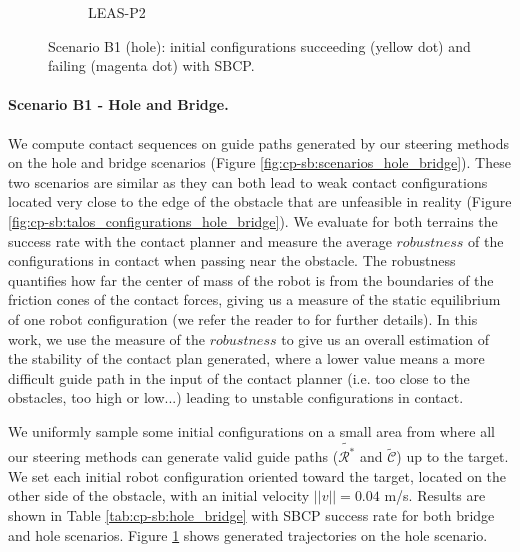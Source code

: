 \begin{figure}[t]
\begin{subfigure}[t]{0.48\linewidth}
        \caption{LEAS-P2}
    \end{subfigure}
    \caption{Scenario B1 (hole): initial configurations succeeding (yellow dot) and failing (magenta dot) with SBCP.}
    \label{fig:cp-sb:trajectories_hole}
\end{figure}

\paragraph{Scenario B1 - Hole and Bridge.} 
We compute contact sequences on guide paths generated by our steering methods on the hole and bridge scenarios (Figure \ref{fig:cp-sb:scenarios_hole_bridge}). 
These two scenarios are similar as they can both lead to weak contact configurations located very close to the edge of the obstacle that are unfeasible in reality (Figure \ref{fig:cp-sb:talos_configurations_hole_bridge}).
We evaluate for both terrains the success rate with the contact planner and measure the average $robustness$ of the configurations in contact when passing near the obstacle.
The robustness quantifies how far the center of mass of the robot is from the boundaries of the friction cones of the contact forces, giving us a measure of the static equilibrium of one robot configuration (we refer the reader to \cite{AcyclicCP} for further details).
In this work, we use the measure of the $robustness$ to give us an overall estimation of the stability of the contact plan generated, where a lower value means a more difficult guide path in the input of the contact planner (i.e. too close to the obstacles, too high or low...) leading to unstable configurations in contact.

 


We uniformly sample some initial configurations on a small area from where all our steering methods can generate valid guide paths ($\tilde{\mathcal{R}^*}$ and $\tilde{\mathcal{C}}$) up to the target.
We set each initial robot configuration oriented toward the target, located on the other side of the obstacle, with an initial velocity $||v||=0.04$ m/s.
Results are shown in Table \ref{tab:cp-sb:hole_bridge} with SBCP success rate for both bridge and hole scenarios. Figure \ref{fig:cp-sb:trajectories_hole} shows generated trajectories on the hole scenario.


